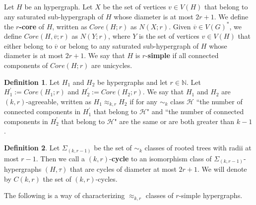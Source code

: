 \documentclass[12pt,notitlepage,a4paper]{article}
\theoremstyle{definition}
\newtheorem{definition}{Definition}[section]
\newcommand{\N}{\mathbb{N}}
\begin{document}
Let $H$ be an hypergraph. Let $X$ be the set of vertices $v\in V(H)$
that belong to any saturated sub-hypergraph of $H$
whose diameter is at most $2r+1$. 
We define the \textbf{$r$-core} of $H$, 
written as $Core(H;r)$ as $N(X;r)$. Given 
$\overline{v}\in V(G)^*$, we define $Core(H,\overline{v};r)$
as $N(Y;r)$, where $Y$ is the set of vertices $v\in V(H)$ that either
belong to $\overline{v}$ or belong to any saturated sub-hypergraph of $H$
whose diameter is at most $2r+1$.
We say that $H$ is $r$-\textbf{simple} if all connected components
of $Core(H;r)$ are unicycles.
	

\begin{definition} \label{def:agreeability}
	Let $H_1$ and $H_2$ be hypergraphs and let $r\in \N$.
	Let $H^\prime_1:=Core(H_1;r)$ and $H^\prime_2:=Core(H_2;r)$. 
	We say that $H_1$ and $H_2$ are $(k,r)$-agreeable, written
	as $H_1\approx_{k,r} H_2$ if for any $\sim_k$ class $\mathcal{H}$ 
	``the number of connected
	components in $H^\prime_1$ that belong to $\mathcal{H}$" and
	``the number of connected components in $H^\prime_2$ that belong to 
	$\mathcal{H}$" are the same or are both greater than $k-1$.\par

\end{definition}



\begin{definition}
	Let $\Sigma_{(k,r-1)}$ be the set of $\sim_k$ classes
	of rooted trees with radii at most $r-1$. Then
	we call a $(k,r)$-\textbf{cycle} to an isomorphism class
	of $\Sigma_{(k,r-1)}$-hypergraphs 
	$(H,\tau)$ that are cycles of diameter at most $2r+1$.
	We will denote by $C(k,r)$ the set of $(k,r)$-cycles.
\end{definition}

The following is a way of characterizing $\approx_{k,r}$ classes
of $r$-simple hypergraphs.
\end{document}
